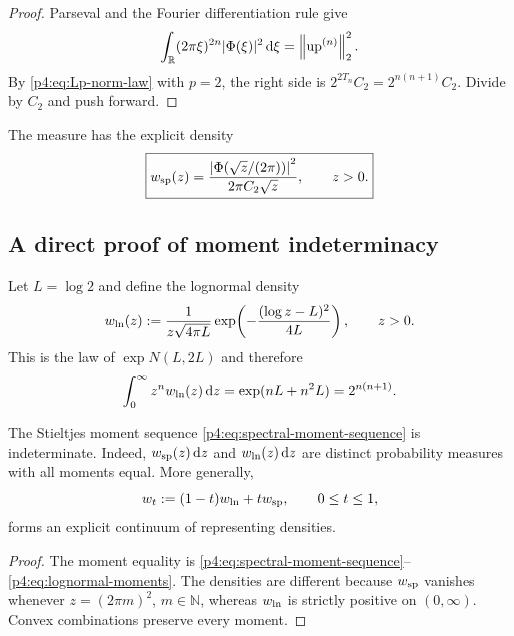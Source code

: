 \documentclass[11pt,oneside]{article}
\theoremstyle{definition}
\theoremstyle{remark}
\newcommand{\R}{\mathbb R}
\newcommand{\N}{\mathbb N}
\newcommand{\Up}{\operatorname{up}}
\newcommand{\dd}{\,\mathrm d}
\begin{document}
\begin{proof}
Parseval and the Fourier differentiation rule give
\[
 \int_{\R}(2\pi\xi)^{2n}|\Phi(\xi)|^2\dd\xi
 =\norm{\Up^{(n)}}_2^2.
\]
By \eqref{p4:eq:Lp-norm-law} with $p=2$, the right side is
$2^{2T_n}C_2=2^{n(n+1)}C_2$.  Divide by $C_2$ and push forward.
\end{proof}

The measure has the explicit density
\begin{equation}
 \boxed{
 w_{\rm sp}(z)
 =\frac{\left|\Phi\!\left(\sqrt z/(2\pi)\right)\right|^2}
 {2\pi C_2\sqrt z},
 \qquad z>0.}
 \label{p4:eq:spectral-density}
\end{equation}

\subsection{A direct proof of moment indeterminacy}

Let $L=\log2$ and define the lognormal density
\begin{equation}
 w_{\rm ln}(z)
 :=\frac1{z\sqrt{4\pi L}}
 \exp\!\left(-\frac{(\log z-L)^2}{4L}\right),
 \qquad z>0.
 \label{p4:eq:lognormal-density}
\end{equation}
This is the law of $\exp N(L,2L)$ and therefore
\begin{equation}
 \int_0^\infty z^n w_{\rm ln}(z)\dd z
 =\exp(nL+n^2L)=2^{n(n+1)}.
 \label{p4:eq:lognormal-moments}
\end{equation}

\begin{corollary}
\label{p4:cor:moment-indeterminacy}
The Stieltjes moment sequence \eqref{p4:eq:spectral-moment-sequence} is indeterminate.
Indeed, $w_{\rm sp}(z)\dd z$ and $w_{\rm ln}(z)\dd z$ are distinct probability measures with
all moments equal.  More generally,
\begin{equation}
 w_t:=(1-t)w_{\rm ln}+tw_{\rm sp},\qquad0\leq t\leq1,
 \label{p4:eq:convex-measures}
\end{equation}
forms an explicit continuum of representing densities.
\end{corollary}

\begin{proof}
The moment equality is \eqref{p4:eq:spectral-moment-sequence}--\eqref{p4:eq:lognormal-moments}.
The densities are different because $w_{\rm sp}$ vanishes whenever
$z=(2\pi m)^2$, $m\in\N$, whereas $w_{\rm ln}$ is strictly positive on $(0,\infty)$.
Convex combinations preserve every moment.
\end{proof}
\end{document}
